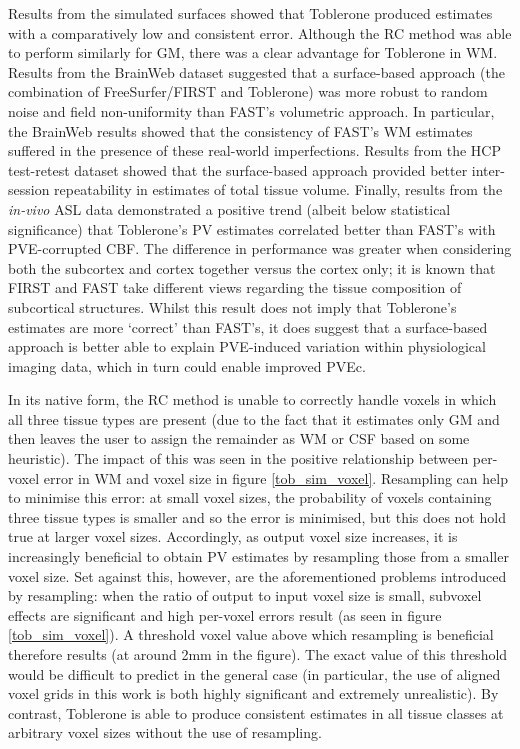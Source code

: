 \documentclass[12pt]{report}
\begin{document}
Results from the simulated surfaces showed that Toblerone produced estimates with a comparatively low and consistent error. Although the RC method was able to perform similarly for GM, there was a clear advantage for Toblerone in WM. Results from the BrainWeb dataset suggested that a surface-based approach (the combination of FreeSurfer/FIRST and Toblerone) was more robust to random noise and field non-uniformity than FAST’s volumetric approach. In particular, the BrainWeb results showed that the consistency of FAST’s WM estimates suffered in the presence of these real-world imperfections. Results from the HCP test-retest dataset showed that the surface-based approach provided better inter-session repeatability in estimates of total tissue volume. Finally, results from the \textit{in-vivo} ASL data demonstrated a positive trend (albeit below statistical significance) that Toblerone's PV estimates correlated better than FAST's with PVE-corrupted CBF. The difference in performance was greater when considering both the subcortex and cortex together versus the cortex only; it is known that FIRST and FAST take different views regarding the tissue composition of subcortical structures. Whilst this result does not imply that Toblerone's estimates are more `correct' than FAST's, it does suggest that a surface-based approach is better able to explain PVE-induced variation within physiological imaging data, which in turn could enable improved PVEc. 

In its native form, the RC method is unable to correctly handle voxels in which all three tissue types are present (due to the fact that it estimates only GM and then leaves the user to assign the remainder as WM or CSF based on some heuristic). The impact of this was seen in the positive relationship between per-voxel error in WM and voxel size in figure \ref{tob_sim_voxel}. Resampling can help to minimise this error: at small voxel sizes, the probability of voxels containing three tissue types is smaller and so the error is minimised, but this does not hold true at larger voxel sizes. Accordingly, as output voxel size increases, it is increasingly beneficial to obtain PV estimates by resampling those from a smaller voxel size. Set against this, however, are the aforementioned problems introduced by resampling: when the ratio of output to input voxel size is small, subvoxel effects are significant and high per-voxel errors result (as seen in figure \ref{tob_sim_voxel}). A threshold voxel value above which resampling is beneficial therefore results (at around 2mm in the figure). The exact value of this threshold would be difficult to predict in the general case (in particular, the use of aligned voxel grids in this work is both highly significant and extremely unrealistic). By contrast, Toblerone is able to produce consistent estimates in all tissue classes at arbitrary voxel sizes without the use of resampling. 
\end{document}
